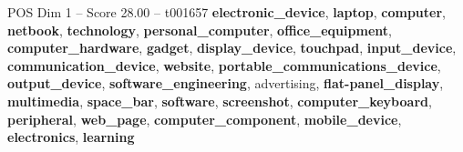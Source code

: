 \begin{textsample}{POS Dim 1 – Score 28.00 – t001657}  \label{ex:f1_pos_020}
\textbf{electronic\_device}, \textbf{laptop}, \textbf{computer}, \textbf{netbook}, \textbf{technology}, \textbf{personal\_computer}, \textbf{office\_equipment}, \textbf{computer\_hardware}, \textbf{gadget}, \textbf{display\_device}, \textbf{touchpad}, \textbf{input\_device}, \textbf{communication\_device}, \textbf{website}, \textbf{portable\_communications\_device}, \textbf{output\_device}, \textbf{software\_engineering}, advertising, \textbf{flat-panel\_display}, \textbf{multimedia}, \textbf{space\_bar}, \textbf{software}, \textbf{screenshot}, \textbf{computer\_keyboard}, \textbf{peripheral}, \textbf{web\_page}, \textbf{computer\_component}, \textbf{mobile\_device}, \textbf{electronics}, \textbf{learning}

\end{textsample}
